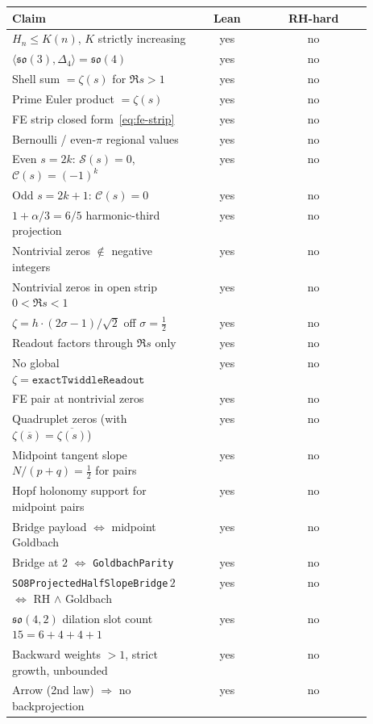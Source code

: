 \documentclass[11pt]{amsart}
\begin{document}
\begin{table}[h]
\centering
\small
\begin{tabular}{@{}p{0.52\linewidth}cc@{}}
\toprule
Claim & Lean & RH-hard \\
\midrule
$H_n\le K(n)$, $K$ strictly increasing & yes & no \\
$\langle\mathfrak{so}(3),\Delta_4\rangle=\mathfrak{so}(4)$ & yes & no \\
Shell sum $=\zeta(s)$ for $\Re s>1$ & yes & no \\
Prime Euler product $=\zeta(s)$ & yes & no \\
FE strip closed form~\eqref{eq:fe-strip} & yes & no \\
Bernoulli / even-$\pi$ regional values & yes & no \\
Even $s=2k$: $\mathcal{S}(s)=0$, $\mathcal{C}(s)=(-1)^k$ & yes & no \\
Odd $s=2k+1$: $\mathcal{C}(s)=0$ & yes & no \\
$1+\alpha/3=6/5$ harmonic-third projection & yes & no \\
Nontrivial zeros $\notin$ negative integers & yes & no \\
Nontrivial zeros in open strip $0<\Re s<1$ & yes & no \\
$\zeta=h\cdot(2\sigma-1)/\sqrt2$ off $\sigma=\tfrac12$ & yes & no \\
Readout factors through $\Re s$ only & yes & no \\
No global $\zeta=\texttt{exactTwiddleReadout}$ & yes & no \\
FE pair at nontrivial zeros & yes & no \\
Quadruplet zeros (with $\zeta(\overline{s})=\overline{\zeta(s)}$) & yes & no \\
Midpoint tangent slope $N/(p+q)=\tfrac12$ for pairs & yes & no \\
Hopf holonomy support for midpoint pairs & yes & no \\
Bridge payload $\Leftrightarrow$ midpoint Goldbach & yes & no \\
Bridge at $2$ $\Leftrightarrow$ \texttt{GoldbachParity} & yes & no \\
\texttt{SO8ProjectedHalfSlopeBridge}\,$2$ $\Leftrightarrow$ RH $\wedge$ Goldbach & yes & no \\
$\mathfrak{so}(4,2)$ dilation slot count $15=6+4+4+1$ & yes & no \\
Backward weights $>1$, strict growth, unbounded & yes & no \\
Arrow (2nd law) $\Rightarrow$ no backprojection & yes & no \\

\end{tabular}
\end{table}
\end{document}
